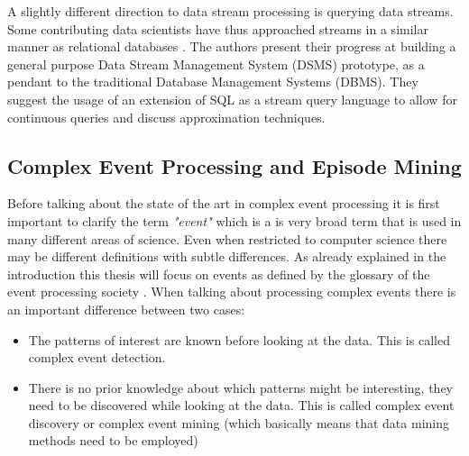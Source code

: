 A slightly different direction to data stream processing is querying data streams. Some contributing data scientists have thus approached streams in a similar manner as relational databases \cite{motwani2003query}. The authors present their progress at building a general purpose Data Stream Management System (DSMS) prototype, as a pendant to the traditional Database Management Systems (DBMS). They suggest the usage of an extension of SQL as a stream query language to allow for continuous queries and discuss approximation techniques. 

\subsection{Complex Event Processing and Episode Mining}
\label{subsec_eventProcessing}
Before talking about the state of the art in complex event processing it is first important to clarify the term \textit{"event"} which is a is very broad term that is used in many different areas of science. Even when restricted to computer science there may be different definitions with subtle differences. As already explained in the introduction this thesis will focus on events as defined by the glossary of the event processing society \cite{luckham2011epts}.
When talking about processing complex events there is an important difference between two cases:

\begin{itemize}
	\item The patterns of interest are known before looking at the data. This is called complex event detection.
	\item There is no prior knowledge about which patterns might be interesting, they need to be discovered while looking at the data. This is called complex event discovery or complex event mining (which basically means that data mining methods need to be employed)
\end{itemize}

